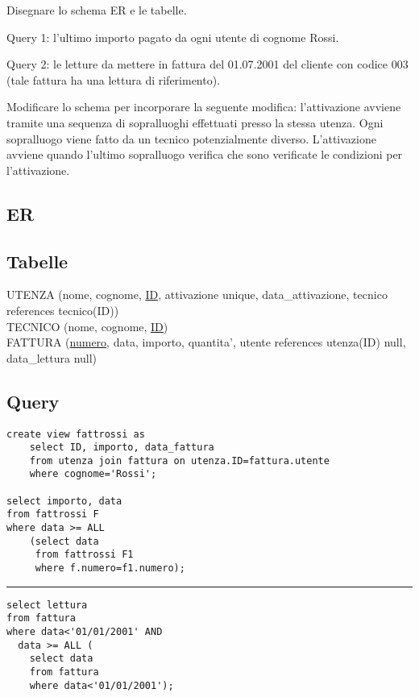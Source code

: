 \documentclass[11pt]{article}
\begin{document}
Disegnare lo schema ER e le tabelle.

Query 1: l'ultimo importo pagato da ogni utente di cognome Rossi.

Query 2: le letture da mettere in fattura del 01.07.2001 del cliente con codice 003 (tale
fattura ha una lettura di riferimento).

Modificare lo schema per incorporare la seguente modifica: l'attivazione avviene
tramite una sequenza di sopralluoghi effettuati presso la stessa utenza. Ogni
sopralluogo viene fatto da un tecnico potenzialmente diverso. L'attivazione
avviene quando l'ultimo sopralluogo verifica che sono verificate le condizioni
per l'attivazione.
\subsection{ER}
\begin{center}
\end{center}

\subsection{Tabelle}

\noindent
UTENZA (nome, cognome, \underline{ID}, attivazione unique, data\_attivazione,
tecnico references tecnico(ID))\\
TECNICO (nome, cognome, \underline{ID})\\
FATTURA (\underline{numero}, data, importo, quantita', utente references utenza(ID) null,
data\_lettura null)\\

\subsection{Query}

\begin{verbatim}
create view fattrossi as
    select ID, importo, data_fattura
    from utenza join fattura on utenza.ID=fattura.utente
    where cognome='Rossi';

select importo, data
from fattrossi F
where data >= ALL
    (select data
     from fattrossi F1
     where f.numero=f1.numero);
\end{verbatim}

\hrule

\begin{verbatim}
select lettura
from fattura
where data<'01/01/2001' AND
  data >= ALL (
    select data
    from fattura
    where data<'01/01/2001');
\end{verbatim}
\end{document}

